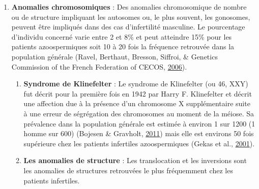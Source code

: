 \documentclass[12pt,twoside]{reedthesis}
\providecommand{\tightlist}{%
  \setlength{\itemsep}{0pt}\setlength{\parskip}{0pt}}
\theoremstyle{definition}
\theoremstyle{definition}
\theoremstyle{remark}
\begin{document}
  \begin{enumerate}
  \def\labelenumi{\arabic{enumi}.}
  \setcounter{enumi}{1}
  \tightlist
  \item
    \textbf{Anomalies chromosomiques} : Des anomalies chromosomique de
    nombre ou de structure impliquant les autosomes ou, le plus souvent,
    les gonosomes, peuvent être impliqués dans des cas d'infertilité
    masculine. Le pourcentage d'individu concerné varie entre 2 et 8\% et
    peut atteindre 15\% pour les patients azoospermiques soit 10 à 20 fois
    la fréquence retrouvée dans la population générale (Ravel, Berthaut,
    Bresson, Siffroi, \& Genetics Commission of the French Federation of
    CECOS, \protect\hyperlink{ref-Ravel2006}{2006}).
  
    \begin{enumerate}
    \def\labelenumii{\alph{enumii}.}
    \tightlist
    \item
      \textbf{Syndrome de Klinefelter} : Le syndrome de Klinefelter (ou
      46, XXY) fut décrit pour la première fois en 1942 par Harry F.
      Klinefelter et décrit une affection due à la présence d'un
      chromosome X supplémentaire suite à une erreur de ségrégation des
      chromosomes au moment de la méiose. Sa prévalence dans la population
      générale est estimée à environ 1 sur 1200 (1 homme sur 600) (Bojesen
      \& Gravholt, \protect\hyperlink{ref-Bojesen2011}{2011}) mais elle
      est environs 50 fois supérieure chez les patients infertiles
      azoospermiques (Gekas et al.,
      \protect\hyperlink{ref-Gekas2001}{2001}).\\
    \item
      \textbf{Les anomalies de structure} : Les translocation et les
      inversions sont les anomalies de structures retrouvées le plus
      fréquemment chez les patients infertiles.
  

\end{enumerate}
\end{enumerate}
\end{document}
